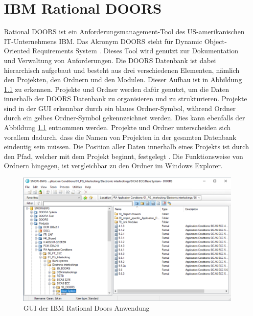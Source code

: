 \chapter{IBM Rational DOORS}
\label{chap:kapitel3}

Rational DOORS ist ein Anforderungsmanagement-Tool des US-amerikanischen IT-Unternehmens IBM. Das Akronym DOORS steht für Dynamic Object-Oriented Requirements System \cite[]{q5}.
Dieses Tool wird genutzt zur Dokumentation und Verwaltung von Anforderungen. Die DOORS Datenbank ist dabei hierarchisch aufgebaut und besteht aus drei verschiedenen Elementen, nämlich den 
Projekten, den Ordnern und den Modulen. Dieser Aufbau ist in Abbildung \ref*{fig:Doors GUI} zu erkennen. Projekte und Ordner werden dafür genutzt, um die Daten innerhalb der DOORS Datenbank 
zu organisieren und zu strukturieren. Projekte sind in der GUI erkennbar durch ein blaues Ordner-Symbol, während Ordner durch ein gelbes Ordner-Symbol gekennzeichnet werden. Dies kann ebenfalls der 
Abbildung \ref*{fig:Doors GUI} entnommen werden. Projekte und Ordner unterscheiden sich vorallem dadurch, dass die Namen von Projekten in der gesamten Datenbank eindeutig sein müssen. 
Die Position aller Daten innerhalb eines Projekts ist durch den Pfad, welcher mit dem Projekt beginnt, festgelegt \cite[]{q6}. Die Funktionsweise von Ordnern hingegen, ist vergleichbar 
zu den Ordner im Windows Explorer.     

\begin{figure}[H]
    \centering
    \includegraphics[width = \textwidth]{abbildungen/IBM Doors.PNG}
    \caption{GUI der IBM Rational Doors Anwendung}
    \label{fig:Doors GUI}
\end{figure}

